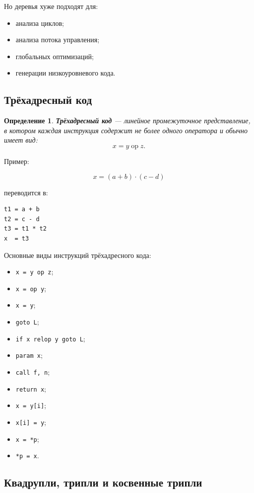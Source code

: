 \documentclass[12pt,a4paper]{article}
\newtheorem{definition}{Определение}
\begin{document}
Но деревья хуже подходят для:
\begin{itemize}
    \item анализа циклов;
    \item анализа потока управления;
    \item глобальных оптимизаций;
    \item генерации низкоуровневого кода.
\end{itemize}

\subsection{Трёхадресный код}

\begin{definition}
\textbf{Трёхадресный код} --- линейное промежуточное представление, в котором каждая инструкция содержит не более одного оператора и обычно имеет вид:
\[
x = y \operatorname{op} z.
\]
\end{definition}

Пример:

\[
x = (a+b)\cdot(c-d)
\]

переводится в:

\begin{lstlisting}
t1 = a + b
t2 = c - d
t3 = t1 * t2
x  = t3
\end{lstlisting}

Основные виды инструкций трёхадресного кода:
\begin{itemize}
    \item \texttt{x = y op z};
    \item \texttt{x = op y};
    \item \texttt{x = y};
    \item \texttt{goto L};
    \item \texttt{if x relop y goto L};
    \item \texttt{param x};
    \item \texttt{call f, n};
    \item \texttt{return x};
    \item \texttt{x = y[i]};
    \item \texttt{x[i] = y};
    \item \texttt{x = *p};
    \item \texttt{*p = x}.
\end{itemize}

\subsection{Квадрупли, трипли и косвенные трипли}
\end{document}
